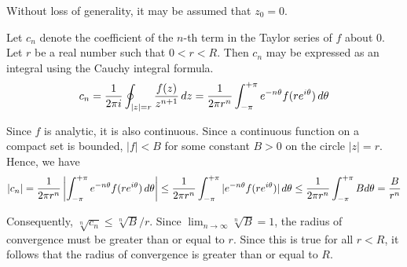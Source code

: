 \documentclass[12pt]{article}
\begin{document}
Without loss of generality, it may be assumed that $z_0 = 0$.

Let $c_n$ denote the coefficient of the $n$-th term in the Taylor series of $f$ about $0$.  Let $r$ be a real number such that $0 < r < R$.  Then $c_n$ may be expressed as an integral using the Cauchy integral formula.
 $$c_n = {1 \over 2 \pi i} \oint_{|z| = r} {f(z) \over z^{n+1}} \, dz = {1 \over 2 \pi r^n} \int_{-\pi}^{+\pi} e^{-n \theta} f(r e^{i \theta}) \, d \theta$$

Since $f$ is analytic, it is also continuous.  Since a continuous function on a compact set is bounded, $|f| < B$ for some constant $B > 0$ on the circle $|z| = r$.  Hence, we have
 $$|c_n| = {1 \over 2 \pi r^n} \left| \int_{-\pi}^{+\pi} e^{-n \theta} f(r e^{i \theta}) \, d \theta \right| \le {1 \over 2 \pi r^n} \int_{-\pi}^{+\pi} | e^{-n \theta} f(r e^{i \theta}) | \, d \theta \le {1 \over 2 \pi r^n} \int_{-\pi}^{+\pi} B d \theta = {B \over r^n}$$

Consequently, $\sqrt[n]{c_n} \le \sqrt[n]{B} / r$.  Since $\lim_{n \to \infty} \sqrt[n]{B} = 1$, the radius of convergence must be greater than or equal to $r$.  Since this is true for all $r < R$, it follows that the radius of convergence is greater than or equal to $R$.
\end{document}
